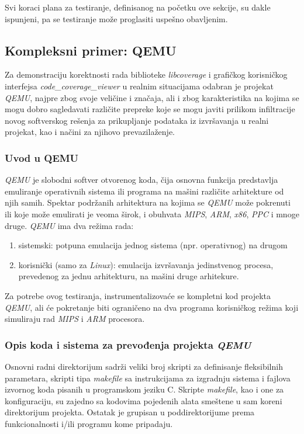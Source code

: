 \documentclass[12pt,oneside]{memoir}
\newcommand{\strano}[1]{\textit{#1}}
\begin{document}
Svi koraci plana za testiranje, definisanog na početku ove sekcije, su dakle ispunjeni, pa se testiranje može proglasiti uspešno obavljenim. 


\subsection{Kompleksni primer: QEMU}

Za demonstraciju korektnosti rada biblioteke \strano{libcoverage} i grafičkog korisničkog interfejsa \strano{code\_coverage\_viewer} u realnim situacijama odabran je projekat \strano{QEMU}, najpre zbog svoje veličine i značaja, ali i zbog karakteristika na kojima se mogu dobro sagledavati različite prepreke koje se mogu javiti prilikom infiltracije novog softverskog rešenja za prikupljanje podataka iz izvršavanja u realni projekat, kao i načini za njihovo prevazilaženje.

\subsubsection{Uvod u QEMU}

\strano{QEMU} \cite{QEMU} je slobodni softver otvorenog koda, čija osnovna funkcija predstavlja emuliranje operativnih sistema ili programa na mašini različite arhitekture od njih samih. Spektar podržanih arhitektura na kojima se \strano{QEMU} može pokrenuti ili koje može emulirati je veoma širok, i obuhvata \strano{MIPS}, \strano{ARM}, \strano{x86}, \strano{PPC} i mnoge druge.
\strano{QEMU} ima dva režima rada:
\begin{enumerate}
\item sistemski: potpuna emulacija jednog sistema (npr. operativnog) na drugom
\item korisnički (samo za \strano{Linux}): emulacija izvršavanja jedinstvenog procesa, prevedenog za jednu arhitekturu, na mašini druge arhitekure.
\end{enumerate}
Za potrebe ovog testiranja, instrumentalizovaće se kompletni kod projekta \strano{QEMU}, ali će pokretanje biti ograničeno na dva programa korisničkog režima koji simuliraju rad \strano{MIPS} i \strano{ARM} procesora.

\subsubsection{Opis koda i sistema za prevođenja projekta \strano{QEMU}}

Osnovni radni direktorijum sadrži veliki broj skripti za definisanje fleksibilnih parametara, skripti tipa \strano{makefile} sa instrukcijama za izgradnju sistema i fajlova izvornog koda pisanih u programskom jeziku C. Skripte \strano{makefile}, kao i one za konfiguraciju, su zajedno sa kodovima pojedenih alata smeštene u sam koreni direktorijum projekta. Ostatak je grupisan u poddirektorijume prema funkcionalnosti i/ili programu kome pripadaju.
\end{document}
